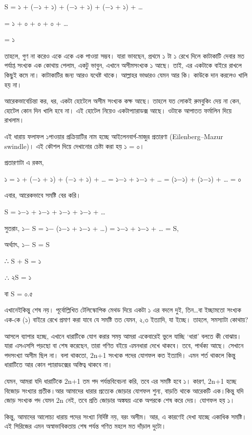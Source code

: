 \documentclass[
]{book}
\begin{document}
S = ১ + (−১ + ১) + (−১ + ১) + (−১ + ১) + \ldots{}

= ১ + ০ + ০ + ০ + \ldots{}

= ১

তাহলে, গুণ না করেও একে একে এক পাওয়া সম্ভব। যারা ভাবছেন, প্রথমে ১ টা ১ রেখে দিলে কাটাকাটি দেবার মত পর্যাপ্ত সংখ্যক এক কোথায় পেলাম, একটু ভাবুন, এখানে অসীমসংখ্যক ১ আছে। তাই, এর একটাকে বাইরে রাখলে কিছুই কমে না। কাটাকাটির জন্য আরও যথেষ্ট থাকে। আল্লাহর ভাণ্ডারও যেমন আর কি। কাউকে দান করলেও খালি হয় না।

আরেকভাবেচিন্তা কর, ধর, একটা হোটেলে অসীম সংখ্যক কক্ষ আছে। তাহলে যত লোকই রুমবুকিং দেয় না কেন, হোটেল কোন দিন খালি হবে না। এই হোটেল নিয়েও একটাপ্যারাডক্স আছে। ওটাকে আপাতত ফর্মালিন দিয়ে রাখলাম।

এই ধারায় ফলাফল ১পাওয়ার প্রক্রিয়াটির নাম হচ্ছে আইলেনবার্গ-মাজুর প্রতারণা (Eilenberg--Mazur swindle)। এই কৌশল দিয়ে দেখানোর চেষ্টা করা হয় ১ = ০।

প্রতারণাটা এ রকম,

১ = ১ + (−১ + ১) + (−১ + ১) + \ldots{} = ১−১ + ১−১ + \ldots{} = (১−১) + (১−১) + \ldots{} = ০

এবার, আরেকভাবে সমষ্টি বের করি।

S = ১−১ + ১−১ + ১−১ + ১−১ + \ldots{}

সুতরাং, ১− S = ১− (১−১ + ১−১ + \ldots) = ১−১ + ১−১ + \ldots{} = S,

অর্থ্যাৎ, ১− S = S

∴ S + S = ১

∴ ২S = ১

বা S = ০.৫

এখানেইকিন্তু শেষ নয়। পূর্বোল্লিখিত টেলিস্কোপিক মেথড দিয়ে একটা ১ এর বদলে দুই, তিন\ldots বা ইচ্ছামতো সংখ্যক এক-কে (১) বাইরে রেখে প্রমাণ করা যাবে যে সমষ্টি তত যেমন, ২,৩ ইত্যাদি, যা ইচ্ছে। তাহলে, সমস্যাটা কোথায়?

আসলে ব্যাপার হচ্ছে, এখানে ধারাটিকে যোগ করার সময় আমরা একেবারেই ভুলে যাচ্ছি `ধারা' বলতে কী বোঝায়। যারা এসএসসি পড়ছো বা শেষ করেছেন, তারা গণিত বইয়ে এমনধারা দেখে থাকবে। তবে, পার্থক্য আছে। সেখানে পদসংখ্যা অসীম ছিল না। বলা থাকতো, 2n+1 সংখ্যক পদের যোগফল কত ইত্যাদি। এমন শর্ত থাকলে কিন্তু ধারাটিতে আর কোন প্যারাডক্সের অস্তিত্ব থাকবে না।

যেমন, আমরা যদি ধারাটিকে 2n+1 তম পদ পর্যন্তবিবেচনা করি, তবে এর সমষ্টি হবে ১। কারণ, 2n+1 হচ্ছে বিজোড় সংখ্যার প্রতীক।আর আমাদের ধারার প্রত্যেক জোড়ার যোগফল শুন্য, বাড়তি থাকে আরেকটি এক।কিন্তু যদি জোড় সংখ্যক পদ যেমন 2n নেই, তবে প্রতি জোড়ার অঙ্কদ্বয় একে অপরকে শেষ করে দেয়। যোগফল হয় ১।

কিন্তু, আমাদের আলোচ্য ধারায় পদের সংখ্যা নির্দিষ্ট নয়, বরং অসীম। আর, এ কারণেই দেখা যাচ্ছে একাধিক সমষ্টি।
এই সিরিজের এমন অস্বাভাবিকতায় শেষ পর্যন্ত গণিত মহলে মত দাঁড়াল দুটো।
\end{document}
